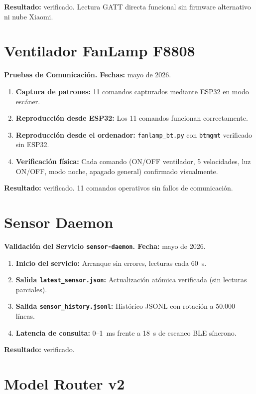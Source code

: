 \textbf{Resultado:} verificado. Lectura GATT directa funcional sin firmware alternativo ni nube Xiaomi.

\section{Ventilador FanLamp F8808}
\label{sec:pruebas_fanlamp}

\textbf{Pruebas de Comunicación. Fechas:} mayo de 2026.

\begin{enumerate}
    \item \textbf{Captura de patrones:} 11 comandos capturados mediante ESP32 en modo escáner.
    \item \textbf{Reproducción desde ESP32:} Los 11 comandos funcionan correctamente.
    \item \textbf{Reproducción desde el ordenador:} \texttt{fanlamp\_bt.py} con \texttt{btmgmt} verificado sin ESP32.
    \item \textbf{Verificación física:} Cada comando (ON/OFF ventilador, 5 velocidades, luz ON/OFF, modo noche, apagado general) confirmado visualmente.
\end{enumerate}

\textbf{Resultado:} verificado. 11 comandos operativos sin fallos de comunicación.

\section{Sensor Daemon}
\label{sec:pruebas_daemon}

\textbf{Validación del Servicio \texttt{sensor-daemon}. Fecha:} mayo de 2026.

\begin{enumerate}
    \item \textbf{Inicio del servicio:} Arranque sin errores, lecturas cada 60~s.
    \item \textbf{Salida \texttt{latest\_sensor.json}:} Actualización atómica verificada (sin lecturas parciales).
    \item \textbf{Salida \texttt{sensor\_history.jsonl}:} Histórico JSONL con rotación a 50.000 líneas.
    \item \textbf{Latencia de consulta:} 0--1~ms frente a 18~s de escaneo BLE síncrono.
\end{enumerate}

\textbf{Resultado:} verificado.

\section{Model Router v2}
\label{sec:pruebas_router}

